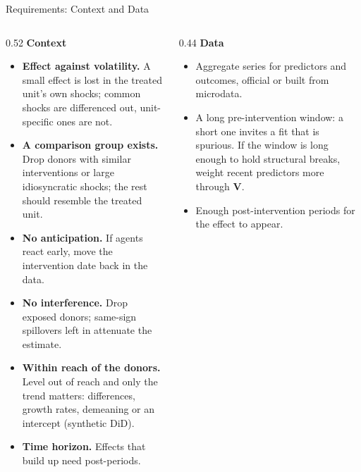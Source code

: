 \documentclass[main.tex]{subfiles}
\begin{document}
\begin{frame}{Requirements: Context and Data}
  \footnotesize
  \begin{columns}[T]
    \begin{column}{0.52\textwidth}
      \textbf{Context}
      \begin{itemize}\footnotesize
        \item \textbf{Effect against volatility.} A small effect is lost in
          the treated unit's own shocks; common shocks are differenced out,
          unit-specific ones are not.
        \item \textbf{A comparison group exists.} Drop donors with similar
          interventions or large idiosyncratic shocks; the rest should
          resemble the treated unit.
        \item \textbf{No anticipation.} If agents react early, move the
          intervention date back in the data.
        \item \textbf{No interference.} Drop exposed donors; same-sign
          spillovers left in attenuate the estimate.
        \item \textbf{Within reach of the donors.} Level out of reach and
          only the trend matters: differences, growth rates, demeaning or an
          intercept (synthetic DiD).
        \item \textbf{Time horizon.} Effects that build up need post-periods.
      \end{itemize}
    \end{column}
    \begin{column}{0.44\textwidth}
      \textbf{Data}
      \begin{itemize}\footnotesize
        \item Aggregate series for predictors and outcomes, official or built
          from microdata.
        \item A long pre-intervention window: a short one invites a fit that
          is spurious. If the window is long enough to
          hold structural breaks, weight recent predictors more through
          $\mathbf{V}$.
        \item Enough post-intervention periods for the effect to appear.
      \end{itemize}
    \end{column}
  \end{columns}
\end{frame}
\end{document}
